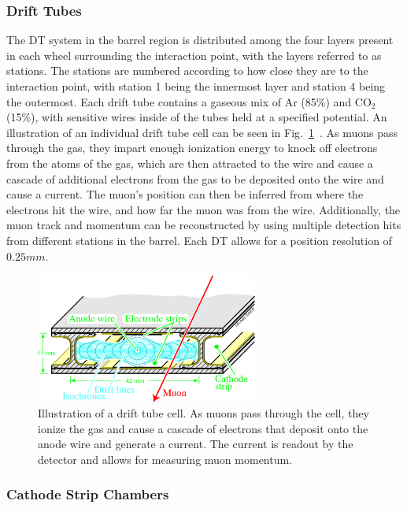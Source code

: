 \subsubsection{Drift Tubes}

The DT system in the barrel region is distributed among the four layers present in each wheel surrounding the interaction point, with the layers referred to as stations.
The stations are numbered according to how close they are to the interaction point, with station 1 being the innermost layer and station 4 being the outermost.
Each drift tube contains a gaseous mix of Ar (85\%) and CO$_2$ (15\%), with sensitive wires inside of the tubes held at a specified potential.
An illustration of an individual drift tube cell can be seen in Fig.~\ref{fig:CMSDTcell}~\cite{Abbiendi_2019}.
As muons pass through the gas, they impart enough ionization energy to knock off electrons from the atoms of the gas, which are then attracted to the wire and cause a cascade of additional electrons from the gas to be deposited onto the wire and cause a current.
The muon's position can then be inferred from where the electrons hit the wire, and how far the muon was from the wire.
Additionally, the muon track and momentum can be reconstructed by using multiple detection hits from different stations in the barrel.
Each DT allows for a position resolution of $0.25\unit{mm}$.

\begin{figure}[htbp]
  \centering
  \includegraphics[width=0.65\textwidth]{fig/experiment/cms_DTcell.pdf}
  \caption{
    Illustration of a drift tube cell.
    As muons pass through the cell, they ionize the gas and cause a cascade of electrons that deposit onto the anode wire and generate a current.
    The current is readout by the detector and allows for measuring muon momentum.
  }
  \label{fig:CMSDTcell}
\end{figure}

\subsubsection{Cathode Strip Chambers}

